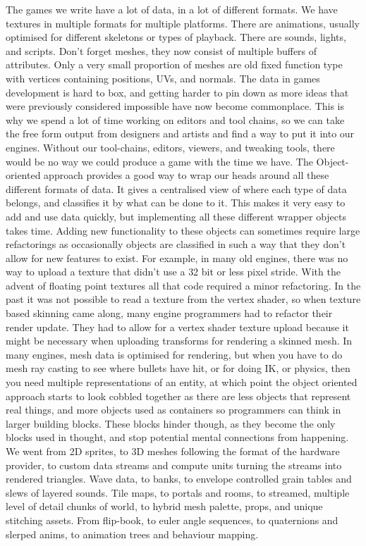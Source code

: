 The games we write have a lot of data, in a lot of different formats. We have
textures in multiple formats for multiple platforms. There are animations,
usually optimised for different skeletons or types of playback. There are
sounds, lights, and scripts. Don't forget meshes, they now consist of multiple
buffers of attributes. Only a very small proportion of meshes are old fixed
function type with vertices containing positions, UVs, and normals. The data in
games development is hard to box, and getting harder to pin down as more ideas
that were previously considered impossible have now become commonplace. This is
why we spend a lot of time working on editors and tool chains, so we can take
the free form output from designers and artists and find a way to put it into
our engines. Without our tool-chains, editors, viewers, and tweaking tools,
there would be no way we could produce a game with the time we have. The
Object-oriented approach provides a good way to wrap our heads around all these
different formats of data. It gives a centralised view of where each type of
data belongs, and classifies it by what can be done to it. This makes it very
easy to add and use data quickly, but implementing all these different wrapper
objects takes time. Adding new functionality to these objects can sometimes
require large refactorings as occasionally objects are classified in such a way
that they don't allow for new features to exist. For example, in many old
engines, there was no way to upload a texture that didn't use a 32 bit or less
pixel stride. With the advent of floating point textures all that code required
a minor refactoring. In the past it was not possible to read a texture from the
vertex shader, so when texture based skinning came along, many engine
programmers had to refactor their render update. They had to allow for a vertex
shader texture upload because it might be necessary when uploading transforms
for rendering a skinned mesh. In many engines, mesh data is optimised for
rendering, but when you have to do mesh ray casting to see where bullets have
hit, or for doing IK, or physics, then you need multiple representations of an
entity, at which point the object oriented approach starts to look cobbled
together as there are less objects that represent real things, and more objects
used as containers so programmers can think in larger building blocks. These
blocks hinder though, as they become the only blocks used in thought, and stop
potential mental connections from happening. We went from 2D sprites, to 3D
meshes following the format of the hardware provider, to custom data streams
and compute units turning the streams into rendered triangles. Wave data, to
banks, to envelope controlled grain tables and slews of layered sounds. Tile
maps, to portals and rooms, to streamed, multiple level of detail chunks of
world, to hybrid mesh palette, props, and unique stitching assets. From
flip-book, to euler angle sequences, to quaternions and slerped anims, to
animation trees and behaviour mapping.


